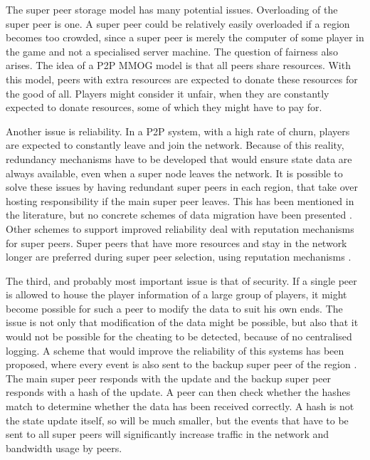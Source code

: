 \documentclass[journal,oneside,a4paper,onecolumn]{IEEEtran}
\begin{document}
The super peer storage model has many potential issues. Overloading of the super peer is one. A super peer could be relatively easily overloaded if a region becomes too crowded, since a super peer is merely the computer of some player in the game and not a specialised server machine. The question of fairness also arises. The idea of a P2P MMOG model is that all peers share resources. With this model, peers with extra resources are expected to donate these resources for the good of all. Players might consider it unfair, when they are constantly expected to donate resources, some of which they might have to pay for.

Another issue is reliability. In a P2P system, with a high rate of churn, players are expected to constantly leave and join the network. Because of this reality, redundancy mechanisms have to be developed that would ensure state data are always available, even when a super node leaves the network. It is possible to solve these issues by having redundant super peers in each region, that take over hosting responsibility if the main super peer leaves. This has been mentioned in the literature, but no concrete schemes of data migration have been presented \cite{}. Other schemes to support improved reliability deal with reputation mechanisms for super peers. Super peers that have more resources and stay in the network longer are preferred during super peer selection, using reputation mechanisms \cite{fan_mediator_paper}.

The third, and probably most important issue is that of security. If a single peer is allowed to house the player information of a large group of players, it might become possible for such a peer to modify the data to suit his own ends. The issue is not only that modification of the data might be possible, but also that it would not be possible for the cheating to be detected, because of no centralised logging. A scheme that would improve the reliability of this systems has been proposed, where every event is also sent to the backup super peer of the region \cite{past_storage_focus}. The main super peer responds with the update and the backup super peer responds with a hash of the update. A peer can then check whether the hashes match to determine whether the data has been received correctly. A hash is not the state update itself, so will be much smaller, but the events that have to be sent to all super peers will significantly increase traffic in the network and bandwidth usage by peers.
\end{document}
